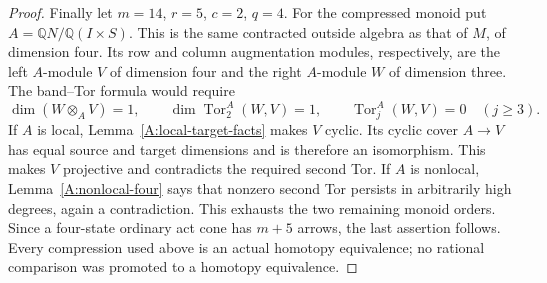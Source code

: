\begin{proof}
Finally let $m=14$, $r=5$, $c=2$, $q=4$. For the compressed
monoid put $A=\mathbb QN/\mathbb Q(I\times S)$. This is the
same contracted outside algebra as that of $M$, of dimension
four. Its row and column augmentation modules, respectively,
are the left $A$-module $V$ of dimension four and the right
$A$-module $W$ of dimension three. The band--Tor formula
would require
\[
 \dim(W\otimes_A V)=1,\qquad
 \dim\operatorname{Tor}_2^A(W,V)=1,\qquad
 \operatorname{Tor}_j^A(W,V)=0\quad(j\geq3).
\]
If $A$ is local, Lemma~\ref{A:local-target-facts} makes $V$
cyclic. Its cyclic cover $A\to V$ has equal source and target
dimensions and is therefore an isomorphism. This makes $V$
projective and contradicts the required second Tor. If $A$
is nonlocal, Lemma~\ref{A:nonlocal-four} says that nonzero
second Tor persists in arbitrarily high degrees, again a
contradiction. This exhausts the two remaining monoid orders.
Since a four-state ordinary act cone has $m+5$ arrows, the
last assertion follows. Every compression used above is an
actual homotopy equivalence; no rational comparison was
promoted to a homotopy equivalence.
\end{proof}
